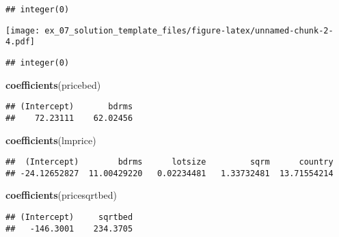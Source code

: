 \documentclass[11pt,]{article}
\newenvironment{Shaded}{\begin{snugshade}}{\end{snugshade}}
\newcommand{\DataTypeTok}[1]{\textcolor[rgb]{0.13,0.29,0.53}{#1}}
\newcommand{\KeywordTok}[1]{\textcolor[rgb]{0.13,0.29,0.53}{\textbf{#1}}}
\newcommand{\NormalTok}[1]{#1}
\newcommand{\OperatorTok}[1]{\textcolor[rgb]{0.81,0.36,0.00}{\textbf{#1}}}
\newcommand{\StringTok}[1]{\textcolor[rgb]{0.31,0.60,0.02}{#1}}
\begin{document}
\begin{verbatim}
## integer(0)
\end{verbatim}

\begin{Shaded}
\end{Shaded}

\texttt{[image: ex\_07\_solution\_template\_files/figure-latex/unnamed-chunk-2-4.pdf]}

\begin{verbatim}
## integer(0)
\end{verbatim}

\begin{Shaded}
\begin{Highlighting}[]
\KeywordTok{coefficients}\NormalTok{(pricebed) }
\end{Highlighting}
\end{Shaded}

\begin{verbatim}
## (Intercept)       bdrms 
##    72.23111    62.02456
\end{verbatim}

\begin{Shaded}
\begin{Highlighting}[]
\KeywordTok{coefficients}\NormalTok{(lmprice) }
\end{Highlighting}
\end{Shaded}

\begin{verbatim}
##  (Intercept)        bdrms      lotsize         sqrm      country 
## -24.12652827  11.00429220   0.02234481   1.33732481  13.71554214
\end{verbatim}

\begin{Shaded}
\begin{Highlighting}[]
\KeywordTok{coefficients}\NormalTok{(pricesqrtbed)}
\end{Highlighting}
\end{Shaded}

\begin{verbatim}
## (Intercept)     sqrtbed 
##   -146.3001    234.3705
\end{verbatim}
\end{document}
